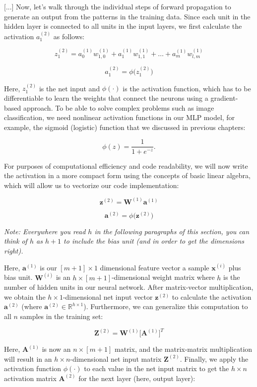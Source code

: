 \documentclass[letterpaper]{report}
\begin{document}
[...] Now, let's walk through the individual steps of forward propagation to generate
an output from the patterns in the training data. Since each unit in the hidden layer
is connected to all units in the input layers, we first calculate the activation $a_{1}^{(2)}$ as follows:

\[
z_{1}^{(2)} = a_{0}^{(1)} w_{1,0}^{(1)} + a_{1}^{(1)} w_{1, 1}^{(1)} + \dots + a_{m}^{(1)} w_{l, m}^{(1)}
\]

\[
a_{1}^{(2)} = \phi \big( z_{1}^{(2)} \big)
\]

Here, $z_{1}^{(2)}$ is the net input and $\phi(\cdot)$ is the activation function, which has to be differentiable to learn the weights that connect the neurons using a gradient-based approach. To be able to solve complex problems such as image classification, we need nonlinear activation functions in our MLP model, for example, the sigmoid (logistic) function that we discussed in previous chapters:

\[
\phi(z) = \frac{1}{1 + e^{-z}}.
\]

For purposes of computational efficiency and code readability, we will now write the activation in a more compact form using the concepts of basic linear algebra, which will allow us to vectorize our code implementation:

\[
\mathbf{z}^{(2)} = \mathbf{W}^{(1)} \mathbf{a}^{(1)}
\]

\[
\mathbf{a}^{(2)} = \phi \big( \mathbf{z}^{(2)} \big)
\]

\textit{Note: Everywhere you read $h$ in the following paragraphs of this section, you can think of $h$ as $h+1$ to include the bias unit (and in order to get the dimensions right).}

Here, $\mathbf{a}^{(1)}$ is our $[m+1] \times 1$ dimensional feature vector a sample $\mathbf{x}^{(i)}$ plus bias unit. $\mathbf{W}^{(i)}$ is an $h \times [m + 1]$-dimensional weight matrix where $h$ is the number of hidden units in our neural network. After matrix-vector multiplication, we obtain the $h \times 1$-dimensional net input vector $\mathbf{z}^{(2)}$ to calculate the activation $\mathbf{a}^{(2)}$ (where $\mathbf{a}^{(2)} \in \mathbb{R}^{h \times 1}$). Furthermore, we can generalize this computation to all $n$ samples in the training set:

\[
\mathbf{Z}^{(2)} = \mathbf{W}^{(1)} \big[ \mathbf{A}^{(1)} \big]^T
\]

Here, $\mathbf{A}^{(1)}$ is now an $n \times [m+1]$ matrix, and the matrix-matrix multiplication will result in an  $h \times n$-dimensional net input matrix $\mathbf{Z}^{(2)}$. Finally, we apply the activation function $\phi(\cdot)$ to each value in the net input matrix to get the $h \times n$ activation matrix $\mathbf{A}^{(2)}$ for the next layer (here, output layer):
\end{document}

